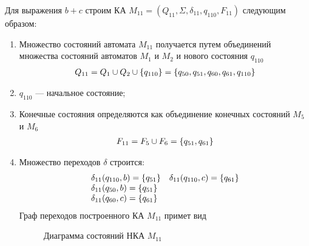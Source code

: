 \newpage
Для выражения \(b+c\) строим КА \(M_{11} = (Q_{11}, \Sigma, \delta_{11}, q_{110}, F_{11})\) следующим образом:
\begin{enumerate}
	\item Множество состояний автомата \(M_{11}\) получается путем объединений множества состояний автоматов \(M_1\) и \(M_2\) и нового состояния \(q_{110}\)
	      \begin{align*}
		      Q_{11} = Q_1 \cup Q_2 \cup \left\{q_{110}\right\} = \left\{q_{50}, q_{51}, q_{60}, q_{61}, q_{110}\right\}
	      \end{align*}
	\item \(q_{110}\) --- начальное состояние;
	\item Конечные состояния определяются как объединение конечных состояний \(M_5\) и \(M_6\)
	      \begin{align*}
		      F_{11} = F_{5} \cup F_{6} = \left\{q_{51}, q_{61}\right\}
	      \end{align*}
	\item Множество переходов \(\delta\) строится:
	      \begin{align*}
		      \begin{array}{ll}
			      \delta_{11}(q_{110}, b) = \left\{q_{51}\right\} & \delta_{11}(q_{110}, c) = \left\{q_{61}\right\} \\
			      \delta_{11}(q_{50}, b) = \left\{q_{51}\right\}                                           \\
			      \delta_{11}(q_{60}, c) = \left\{q_{61}\right\}
		      \end{array}
	      \end{align*}
	      Граф переходов построенного КА \(M_{11}\) примет вид
	      \begin{figure}[h!]
		      \centering
		      \caption{Диаграмма состояний НКА \(M_{11}\)}
	      \end{figure}
\end{enumerate}

